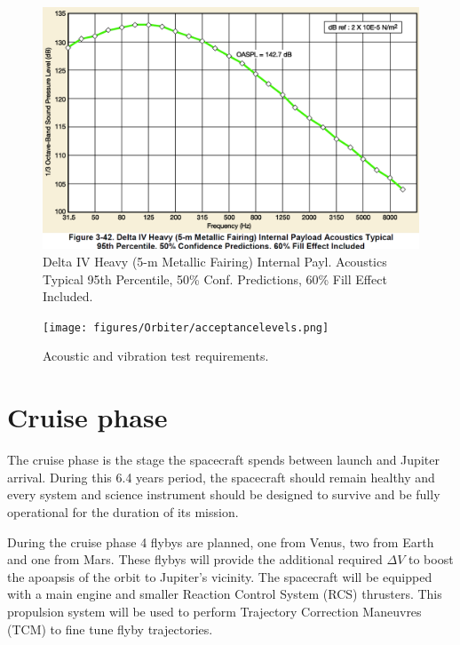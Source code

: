 \begin{figure}[htb!]
\centering
\includegraphics[scale=0.3]{figures/Orbiter/acoustics.png}
\caption{Delta IV Heavy (5-m Metallic Fairing) Internal Payl. Acoustics Typical 95th Percentile, 50\% Conf. Predictions, 60\% Fill Effect Included\cite{Atlasm}.}
\end{figure}

\begin{figure}[htb!]
\centering
\texttt{[image: figures/Orbiter/acceptancelevels.png]}
\caption{Acoustic and vibration test requirements\cite{Atlasm}.}
\label{fig:testlevels}
\end{figure}

\section{Cruise phase}
The cruise phase is the stage the spacecraft spends between launch and Jupiter arrival. During this 6.4 years period, the spacecraft should remain healthy and every system and science instrument should be designed to survive and be fully operational for the duration of its mission. 

During the cruise phase 4 flybys are planned, one from Venus, two from Earth and one from Mars. These flybys will provide the additional required $\Delta V$ to boost the apoapsis of the orbit to Jupiter's vicinity. The spacecraft will be equipped with a main engine and smaller Reaction Control System (RCS) thrusters. This propulsion system will be used to perform Trajectory Correction Maneuvres (TCM) to fine tune flyby trajectories. 

